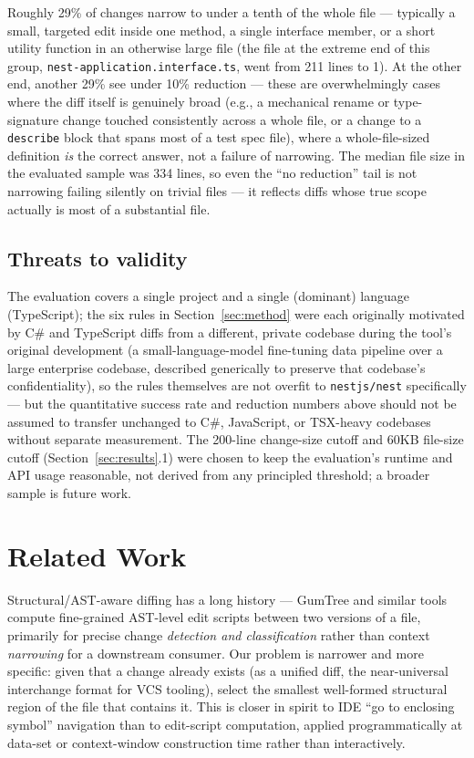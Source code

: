 \documentclass[11pt]{article}
\newcommand{\code}[1]{\texttt{#1}}
\begin{document}
Roughly 29\% of changes narrow to under a tenth of the whole file --- typically a
small, targeted edit inside one method, a single interface member, or a short
utility function in an otherwise large file (the file at the extreme end of this
group, \code{nest-application.interface.ts}, went from 211 lines to 1). At the
other end, another 29\% see under 10\% reduction --- these are overwhelmingly
cases where the diff itself is genuinely broad (e.g., a mechanical rename or
type-signature change touched consistently across a whole file, or a change to a
\code{describe} block that spans most of a test spec file), where a
whole-file-sized definition \emph{is} the correct answer, not a failure of
narrowing. The median file size in the evaluated sample was 334 lines, so even the
``no reduction'' tail is not narrowing failing silently on trivial files --- it
reflects diffs whose true scope actually is most of a substantial file.

\subsection{Threats to validity}

The evaluation covers a single project and a single (dominant) language
(TypeScript); the six rules in Section~\ref{sec:method} were each originally
motivated by C\# and TypeScript diffs from a different, private codebase during
the tool's original development (a small-language-model fine-tuning data pipeline
over a large enterprise codebase, described generically to preserve that
codebase's confidentiality), so the rules themselves are not overfit to
\code{nestjs/nest} specifically --- but the quantitative success rate and
reduction numbers above should not be assumed to transfer unchanged to C\#,
JavaScript, or TSX-heavy codebases without separate measurement. The 200-line
change-size cutoff and 60KB file-size cutoff (Section~\ref{sec:results}.1) were
chosen to keep the evaluation's runtime and API usage reasonable, not derived from
any principled threshold; a broader sample is future work.

\section{Related Work}
\label{sec:related}

Structural/AST-aware diffing has a long history --- GumTree and similar tools
compute fine-grained AST-level edit scripts between two versions of a file,
primarily for precise change \emph{detection and classification}
\cite{falleri2014finegrained} rather than context \emph{narrowing} for a
downstream consumer. Our problem is narrower and more specific: given that a
change already exists (as a unified diff, the near-universal interchange format
for VCS tooling), select the smallest well-formed structural region of the file
that contains it. This is closer in spirit to IDE ``go to enclosing symbol''
navigation than to edit-script computation, applied programmatically at data-set
or context-window construction time rather than interactively.
\end{document}
